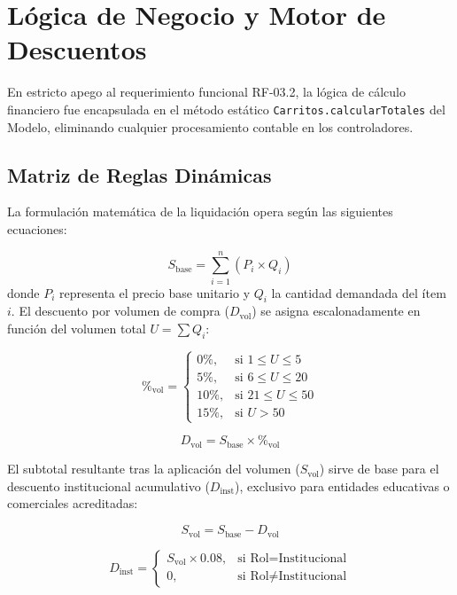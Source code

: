 \documentclass[conference]{IEEEtran}
\begin{document}
\section{Lógica de Negocio y Motor de Descuentos}
En estricto apego al requerimiento funcional RF-03.2, la lógica de cálculo financiero fue encapsulada en el método estático \texttt{Carritos.calcularTotales} del Modelo, eliminando cualquier procesamiento contable en los controladores.

\subsection{Matriz de Reglas Dinámicas}
La formulación matemática de la liquidación opera según las siguientes ecuaciones:

\begin{equation}
S_{\text{base}} = \sum_{i=1}^{n} (P_{i} \times Q_{i})
\end{equation}
donde $P_i$ representa el precio base unitario y $Q_i$ la cantidad demandada del ítem $i$. El descuento por volumen de compra ($D_{\text{vol}}$) se asigna escalonadamente en función del volumen total $U = \sum Q_i$:

\begin{equation}
\%_{\text{vol}} = 
\begin{cases} 
0\%, & \text{si } 1 \le U \le 5 \\
5\%, & \text{si } 6 \le U \le 20 \\
10\%, & \text{si } 21 \le U \le 50 \\
15\%, & \text{si } U > 50 
\end{cases}
\end{equation}

\begin{equation}
D_{\text{vol}} = S_{\text{base}} \times \%_{\text{vol}}
\end{equation}

El subtotal resultante tras la aplicación del volumen ($S_{\text{vol}}$) sirve de base para el descuento institucional acumulativo ($D_{\text{inst}}$), exclusivo para entidades educativas o comerciales acreditadas:

\begin{equation}
S_{\text{vol}} = S_{\text{base}} - D_{\text{vol}}
\end{equation}

\begin{equation}
D_{\text{inst}} = 
\begin{cases} 
S_{\text{vol}} \times 0.08, & \text{si Rol} = \text{Institucional} \\
0, & \text{si Rol} \neq \text{Institucional}
\end{cases}
\end{equation}
\end{document}

